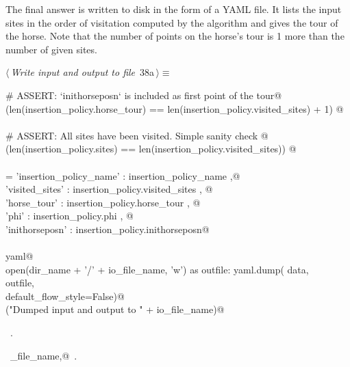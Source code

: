 \documentclass[11.5pt]{report}
\begin{document}
\vspace{-0.8cm}\newchunk The final answer is written to disk in the form of a YAML file. It lists the input sites 
in the order of visitation computed by the algorithm and gives the tour of the horse. 
Note that the number of points on the horse's tour is 1 more than the number of given sites. 
\begin{flushleft} \small\label{scrap51}\raggedright\small
{} $\langle\,${\itshape Write input and output to file}\nobreak\ {\footnotesize {38a}}$\,\rangle\equiv$
\vspace{-1ex}
\begin{list}{}{} \item
\mbox{}\verb@# ASSERT: `inithorseposn` is included as first point of the tour@\\
\mbox{}\verb@assert(len(insertion_policy.horse_tour) == len(insertion_policy.visited_sites) + 1) @\\
\mbox{}\verb@@\\
\mbox{}\verb@# ASSERT: All sites have been visited. Simple sanity check @\\
\mbox{}\verb@assert(len(insertion_policy.sites)   == len(insertion_policy.visited_sites)) @\\
\mbox{}\verb@@\\
\mbox{}\verb@data = {'insertion_policy_name' : insertion_policy_name   ,@\\
\mbox{}\verb@        'visited_sites'  : insertion_policy.visited_sites , @\\
\mbox{}\verb@        'horse_tour'     : insertion_policy.horse_tour    , @\\
\mbox{}\verb@        'phi'            : insertion_policy.phi           , @\\
\mbox{}\verb@        'inithorseposn'  : insertion_policy.inithorseposn}@\\
\mbox{}\verb@@\\
\mbox{}\verb@import yaml@\\
\mbox{}\verb@with open(dir_name + '/' + io_file_name, 'w') as outfile:     yaml.dump( data, \@\\
\mbox{}\verb@                outfile, \@\\
\mbox{}\verb@                default_flow_style=False)@\\
\mbox{}\verb@debug("Dumped input and output to " + io_file_name)@\\
\mbox{}\verb@@{\NWsep}
\end{list}
\vspace{-1.5ex}
\footnotesize
\begin{list}{}{\setlength{\itemsep}{-\parsep}\setlength{\itemindent}{-\leftmargin}}
\item \NWtxtMacroRefIn\ .
\item \NWtxtIdentsUsed\nobreak\  \verb@io_file_name,@\nobreak\ .
\item{}
\end{list}
\vspace{4ex}
\end{flushleft}
\end{document}
